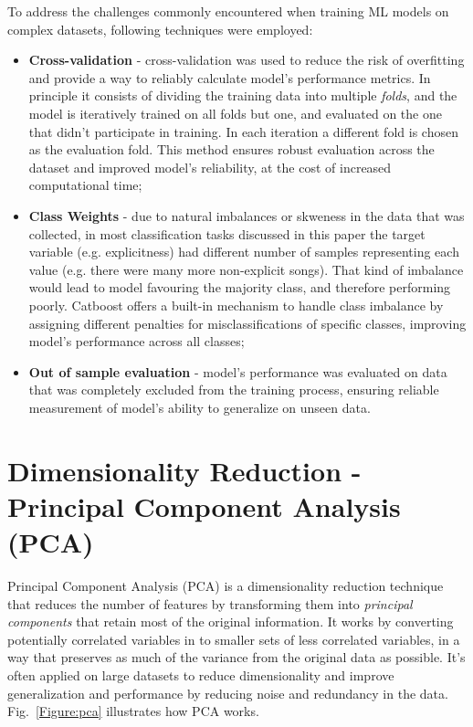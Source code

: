 To address the challenges commonly encountered when training ML models on
complex datasets, following techniques were employed:

\begin{itemize}
  \item \textbf{Cross-validation} - cross-validation was used to reduce the
    risk of overfitting and provide a way to reliably calculate model's
    performance metrics. In principle it consists of dividing the training
    data into multiple \textit{folds}, and the model is iteratively trained
    on all folds but one, and evaluated on the one that didn't participate in
    training. In each iteration a different fold is chosen as the evaluation
    fold. This method ensures robust evaluation across the dataset and improved
    model's reliability, at the cost of increased computational time;
  \item \textbf{Class Weights} - due to natural imbalances or skweness in the
    data that was collected, in most classification tasks discussed in this
    paper the target variable (e.g. explicitness) had different number of samples
    representing each value (e.g. there were many more non-explicit songs). That
    kind of imbalance would lead to model favouring the majority class, and
    therefore performing poorly. Catboost offers a built-in mechanism to handle
    class imbalance by assigning different penalties for misclassifications
    of specific classes, improving model's performance across all classes;
  \item \textbf{Out of sample evaluation} - model's performance was evaluated
    on data that was completely excluded from the training process, ensuring
    reliable measurement of model's ability to generalize on unseen data.
\end{itemize}

\section{Dimensionality Reduction - Principal Component Analysis (PCA)}
\label{sec:dimensionalityreduction}
Principal Component Analysis (PCA) is a dimensionality reduction technique
that reduces the number of features by transforming them into \textit{principal
components} that retain most of the original information. It works by
converting potentially correlated variables in to smaller sets of less correlated
variables, in a way that preserves as much of the variance from the original
data as possible. It's often applied on large datasets to reduce dimensionality
and improve generalization and performance by reducing noise and redundancy
in the data. Fig.~\ref{Figure:pca} illustrates how PCA works. \cite{pca} 

